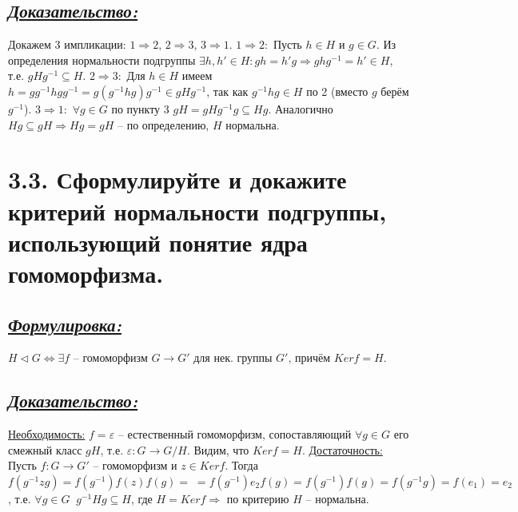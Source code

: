 \documentclass{article}
\begin{document}
\subsection*{\Large \underline{\textit{Доказательство: }}}
Докажем 3 импликации: $1 \Rightarrow 2, \, 2 \Rightarrow 3, \, 3 \Rightarrow 1$.
\newline \indent \underline{$1 \Rightarrow 2:$}
\newline Пусть $h \in H$ и $g \in G$. Из определения нормальности подгруппы 
\newline $\exists h, h' \in H : gh = h'g \Rightarrow ghg^{-1} = h' \in H$, т.е. $gHg^{-1} \subseteq H$. 
\newline \indent \underline{$2 \Rightarrow 3:$}
\newline Для $h \in H$ имеем $h = gg^{-1}hgg^{-1} = g(g^{-1}hg)g^{-1} \in gHg^{-1}$, так как $g^{-1}hg \in H$ по 2 (вместо $g$ берём $g^{-1}$).
\newline \indent \underline{$3 \Rightarrow 1:$}
\newline $\forall g \in G$ по пункту 3 $gH = gHg^{-1}g \subseteq Hg$. Аналогично $Hg \subseteq gH \Rightarrow Hg = gH$ -- по определению, $H$ нормальна.

\section*{\LARGE 3.3. Сформулируйте и докажите критерий нормальности подгруппы, использующий понятие ядра гомоморфизма. }
\subsection*{\Large \underline{\textit{Формулировка: }}}
$H\triangleleft G \Leftrightarrow \exists f \mbox{ -- гомоморфизм } G \rightarrow G' \mbox{ для нек. группы } G',\, \mbox{причём } Kerf = H$. 
\subsection*{\Large \underline{\textit{Доказательство: }}}
$ $\indent \underline{Необходимость:}
\newline $f = \varepsilon$ -- естественный гомоморфизм, сопоставляющий $\forall g \in G$ его смежный класс $gH$, т.е. $\varepsilon: G \rightarrow G / H$. Видим, что $Kerf = H$.
\newline \indent \underline{Достаточность:}
\newline Пусть $f : G \rightarrow G'$ -- гомоморфизм и $z \in Kerf$. Тогда $f(g^{-1}zg) = f(g^{-1})f(z)f(g) = \; = f(g^{-1})e_2f(g) = f(g^{-1})f(g) = f(g^{-1}g) = f(e_1) = e_2$, т.е. $\forall g \in G \;\; g^{-1}Hg \subseteq H$, где $H = Kerf \Rightarrow$ по критерию $H$ -- нормальна.
\end{document}
